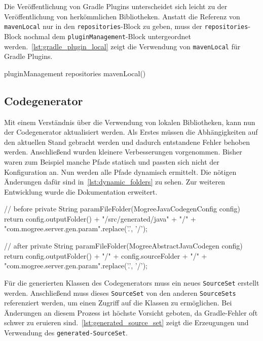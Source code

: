 Die Veröffentlichung von Gradle Plugins unterscheidet sich leicht zu der Veröffentlichung von herkömmlichen Bibliotheken. Anstatt die Referenz von \texttt{mavenLocal} nur in den \texttt{repositories}-Block zu geben, muss der \texttt{repositories}-Block nochmal dem \texttt{pluginManagement}-Block untergeordnet werden.~\autoref{lst:gradle_plugin_local} zeigt die Verwendung von \texttt{mavenLocal} für Gradle Plugins.

\begin{Groovy}[numbers=none, caption={Code zum inkludieren des lokalen Repository für Gradle Plugins.}, label={lst:gradle_plugin_local}]
pluginManagement {
    repositories {
        mavenLocal()
    }
}
\end{Groovy}

\subsection{Codegenerator}

Mit einem Verständnis über die Verwendung von lokalen Bibliotheken, kann nun der Codegenerator aktualisiert werden. Als Erstes müssen die Abhängigkeiten auf den aktuellen Stand gebracht werden und dadurch entstandene Fehler behoben werden. Anschließend wurden kleinere Verbesserungen vorgenommen. Bisher waren zum Beispiel manche Pfade statisch und passten sich nicht der Konfiguration an. Nun werden alle Pfade dynamisch ermittelt. Die nötigen Änderungen dafür sind in~\autoref{lst:dynamic_folders} zu sehen. Zur weiteren Entwicklung wurde die Dokumentation erweitert.

\begin{JavaCode}[numbers=none, caption={Die Funktion, die den Pfad für \texttt{param}-Klassen ermittelt.}, label={lst:dynamic_folders}]
// before
private String paramFileFolder(MogreeJavaCodegenConfig config) {
    return config.outputFolder() + "/src/generated/java" + "/" + "com.mogree.server.gen.param".replace('.', '/');
}

// after
private String paramFileFolder(MogreeAbstractJavaCodegen config) {
    return config.outputFolder() + "/" + config.sourceFolder + "/" + "com.mogree.server.gen.param".replace('.', '/');
}
\end{JavaCode}

Für die generierten Klassen des Codegenerators muss ein neues \texttt{SourceSet} erstellt werden. Anschließend muss dieses \texttt{SourceSet} von den anderen \texttt{SourceSets} referenziert werden, um einen Zugriff auf die Klassen zu ermöglichen. Bei Änderungen an diesem Prozess ist höchste Vorsicht geboten, da Gradle-Fehler oft schwer zu eruieren sind.~\autoref{lst:generated_source_set} zeigt die Erzeugungen und Verwendung des \texttt{generated-SourceSet}.

